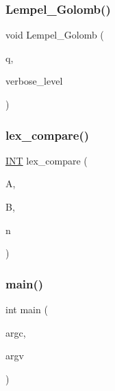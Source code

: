 \mbox{\label{costas_8_c_ac5a4ce7a73f025adc66d94ebdb8f2cfe}} 
\subsubsection{\texorpdfstring{Lempel\+\_\+\+Golomb()}{Lempel\_Golomb()}}
{\footnotesize\ttfamily void Lempel\+\_\+\+Golomb (\begin{DoxyParamCaption}\item[{\mbox{\hyperlink{galois_8h_a09fddde158a3a20bd2dcadb609de11dc}{I\+NT}}}]{q,  }\item[{\mbox{\hyperlink{galois_8h_a09fddde158a3a20bd2dcadb609de11dc}{I\+NT}}}]{verbose\+\_\+level }\end{DoxyParamCaption})}

\mbox{\label{costas_8_c_aebc6ed2ba3265d2e995ee19e0d2c6d2b}} 
\subsubsection{\texorpdfstring{lex\+\_\+compare()}{lex\_compare()}}
{\footnotesize\ttfamily \mbox{\hyperlink{galois_8h_a09fddde158a3a20bd2dcadb609de11dc}{I\+NT}} lex\+\_\+compare (\begin{DoxyParamCaption}\item[{\mbox{\hyperlink{galois_8h_a09fddde158a3a20bd2dcadb609de11dc}{I\+NT}} $\ast$}]{A,  }\item[{\mbox{\hyperlink{galois_8h_a09fddde158a3a20bd2dcadb609de11dc}{I\+NT}} $\ast$}]{B,  }\item[{\mbox{\hyperlink{galois_8h_a09fddde158a3a20bd2dcadb609de11dc}{I\+NT}}}]{n }\end{DoxyParamCaption})}

\mbox{\label{costas_8_c_a3c04138a5bfe5d72780bb7e82a18e627}} 
\subsubsection{\texorpdfstring{main()}{main()}}
{\footnotesize\ttfamily int main (\begin{DoxyParamCaption}\item[{int}]{argc,  }\item[{char $\ast$$\ast$}]{argv }\end{DoxyParamCaption})}


